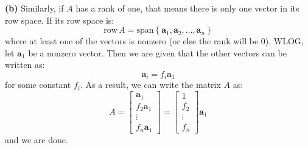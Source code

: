 \documentclass{article}
\newcommand{\spann}[1]{\mathrm{span}\left\{#1\right\}}
\newcommand{\row}[1]{\mathrm{row\,} #1}
\begin{document}
\textbf{(b)} Similarly, if $A$ has a rank of one, that means there is only one vector in its row space. If its row space is:
\begin{equation}
    \row A = \spann{\bm{a}_1, \bm{a}_2, \dots, \bm{a}_n}
\end{equation}
where at least one of the vectors is nonzero (or else the rank will be $0$). WLOG, let $\bm{a}_1$ be a nonzero vector. Then we are given that the other vectors can be written as:
\begin{equation}
    \bm{a}_i = f_i \bm{a}_1
\end{equation} 
for some constant $f_i$. As a result, we can write the matrix $A$ as:
\begin{equation}
    A = \begin{bmatrix}
        \bm{a}_1 \\ 
        f_2\bm{a}_1 \\
        \vdots \\ 
        f_n\bm{a}_1 
    \end{bmatrix} = \begin{bmatrix}
        1 \\ f_2 \\ \vdots \\ f_n
    \end{bmatrix}\bm{a}_1
\end{equation}
and we are done.
\end{document}
